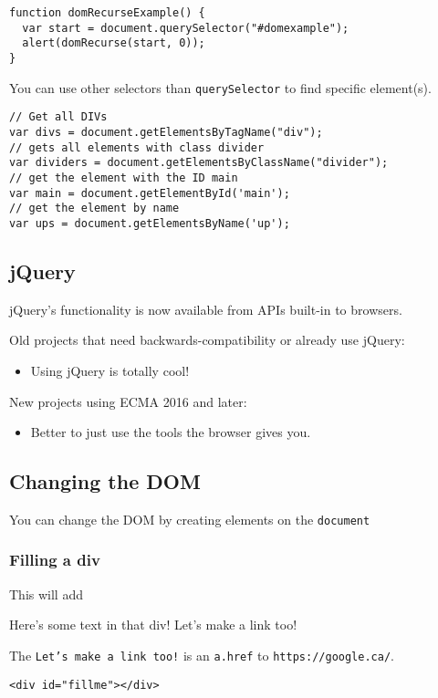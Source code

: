 \documentclass[../CMPUT-404-Notes.tex]{subfiles}
\begin{document}
\begin{verbatim}
function domRecurseExample() {
  var start = document.querySelector("#domexample");
  alert(domRecurse(start, 0));
}
\end{verbatim}

You can use other selectors than \texttt{querySelector} to find specific element(s).
\begin{verbatim}
// Get all DIVs
var divs = document.getElementsByTagName("div"); 
// gets all elements with class divider
var dividers = document.getElementsByClassName("divider"); 
// get the element with the ID main
var main = document.getElementById('main');
// get the element by name
var ups = document.getElementsByName('up');
\end{verbatim}

\subsection{jQuery}
jQuery's functionality is now available from APIs built-in to browsers.

Old projects that need backwards-compatibility or already use jQuery:
\begin{itemize}
    \item 
    Using jQuery is totally cool!
\end{itemize}


New projects using ECMA 2016 and later:
\begin{itemize}
    \item 
    Better to just use the tools the browser gives you.
\end{itemize}


\subsection{Changing the DOM}
You can change the DOM by creating elements on the \texttt{document}

\subsubsection{Filling a div}
This will add
\begin{quotebox}
    Here's some text in that div! Let's make a link too!
\end{quotebox}
The \texttt{Let's make a link too!} is an \texttt{a.href} to \texttt{https://google.ca/}.
\begin{verbatim}
<div id="fillme"></div>
\end{verbatim}
\end{document}
